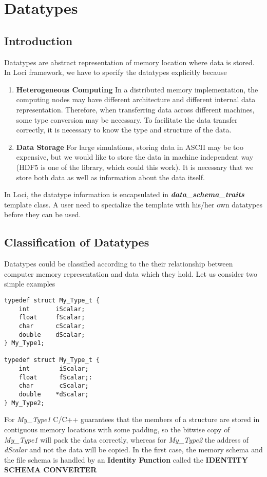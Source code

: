 \chapter{Datatypes }
%
\section {Introduction}
Datatypes are abstract representation of memory location where data is stored.
In Loci framework, we have to specify the datatypes explicitly because
%
%
\begin{enumerate}
\item {\bf Heterogeneous Computing} In a distributed memory implementation, 
the computing nodes may have different architecture and different internal data 
representation. Therefore, when transferring data across different machines, 
some type conversion may be necessary. To facilitate the data transfer correctly,
it is necessary to know the type and structure of the data. 
%
%
\item {\bf Data Storage } For large simulations, storing data in ASCII may
be too expensive, but we would like to store the data in machine independent
way (HDF5 is one of the library, which could this work). It is necessary that
we store both data as well as information about the data itself.
\end{enumerate}
%
%
\par In Loci, the datatype information is encapsulated in 
{\em \bf data\_schema\_traits} template  class.  A user need to specialize 
the template with his/her own datatypes before they can be used.
%
\section {Classification of Datatypes} 
Datatypes could be classified according to the their relationship 
between computer memory representation and data which they hold. Let
us consider two simple examples
%
\begin {verbatim}
typedef struct My_Type_t {
    int       iScalar;
    float     fScalar;
    char      cScalar;
    double    dScalar;
} My_Type1;

typedef struct My_Type_t {
    int        iScalar;
    float      fScalar;:
    char       cScalar;
    double    *dScalar;
} My_Type2;
\end{verbatim}
%
\par For {\em My\_Type1} C/C++ guarantees that the members of a structure are stored in
contiguous memory locations with some padding, so the bitwise copy of
{\em My\_Type1} will pack the data correctly, whereas for {\em My\_Type2} the
address of {\em dScalar} and not the data will be copied. In the first
case, the memory schema and the file schema is handled by an {\bf
Identity Function} called the {\bf IDENTITY SCHEMA CONVERTER } 

